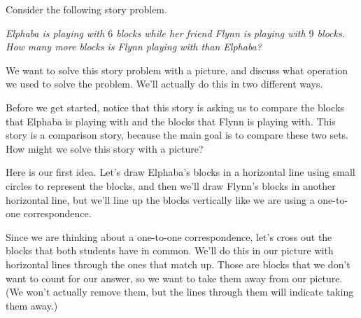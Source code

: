 \documentclass{ximera}
\begin{document}
\begin{example}
Consider the following story problem.

\emph{Elphaba is playing with $6$ blocks while her friend Flynn is playing with $9$ blocks. How many more blocks is Flynn playing with than Elphaba?}

We want to solve this story problem with a picture, and discuss what operation we used to solve the problem. We'll actually do this in two different ways.

Before we get started, notice that this story is asking us to compare the blocks that Elphaba is playing with and the blocks that Flynn is playing with. This story is a comparison story, because the main goal is to compare these two sets. How might we solve this story with a picture?

Here is our first idea. Let's draw Elphaba's blocks in a horizontal line using small circles to represent the blocks, and then we'll draw Flynn's blocks in another horizontal line, but we'll line up the blocks vertically like we are using a one-to-one correspondence.

\begin{image}
\end{image}

Since we are thinking about a one-to-one correspondence, let's cross out the blocks that both students have in common. We'll do this in our picture with horizontal lines through the ones that match up. Those are blocks that we don't want to count for our answer, so we want to take them away from our picture. (We won't actually remove them, but the lines through them will indicate taking them away.)

\begin{image}
\end{image}


\end{example}
\end{document}
